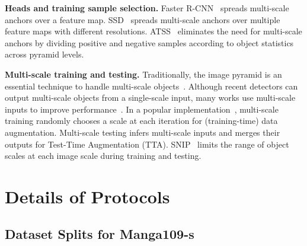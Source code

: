 \documentclass[10pt,twocolumn,letterpaper]{article}
\newcommand{\Mangas}{Manga109-s\xspace}
\begin{document}
\textbf{Heads and training sample selection.}
Faster R-CNN~\cite{Faster_R-CNN_NIPS2015} spreads multi-scale anchors over a feature map.
SSD~\cite{SSD_ECCV2016} spreads multi-scale anchors over multiple feature maps with different resolutions.
ATSS~\cite{ATSS_CVPR2020} eliminates the need for multi-scale anchors
by dividing positive and negative samples according to object statistics across pyramid levels.

\textbf{Multi-scale training and testing.}
Traditionally, the image pyramid is an essential technique to handle multi-scale objects~\cite{Rowley_PAMI1998}.
Although recent detectors can output multi-scale objects from a single-scale input,
many works use multi-scale inputs to improve performance~\cite{Faster_R-CNN_NIPS2015, RetinaNet_ICCV2017, ATSS_CVPR2020, SEPC_CVPR2020}.
In a popular implementation~\cite{MMDetection},
multi-scale training randomly chooses a scale at each iteration
for (training-time) data augmentation.
Multi-scale testing infers multi-scale inputs and merges their outputs
for Test-Time Augmentation (TTA).
SNIP~\cite{SNIP_Singh_CVPR2018} limits the range of object scales at each image scale
during training and testing.




\section{Details of Protocols}


\subsection{Dataset Splits for \Mangas}
\end{document}
